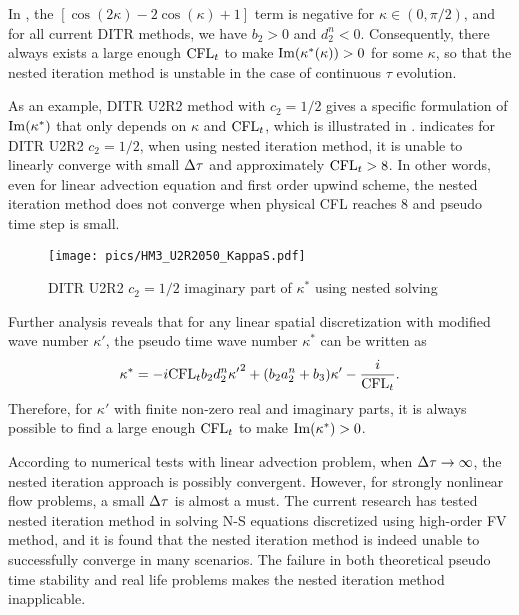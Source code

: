 In ,
the $\left[\cos(2\kappa) -2\cos(\kappa) + 1\right]$ term
is negative for $\kappa \in (0, \pi/2)$, and for
all current DITR methods, we have $b_2>0$ and $d_2^n < 0$.
Consequently, there always exists a large enough $\text{CFL}_t$
to make $\mathrm{Im}(\kappa^*(\kappa)) > 0$ for some $\kappa$,
so that the nested
iteration method is unstable in the case of continuous $\tau$
evolution.

As an example, DITR U2R2 method with $c_2=1/2$ gives
a specific formulation of $\mathrm{Im}(\kappa^*)$ that only depends on $\kappa$
and $\text{CFL}_t$, which is illustrated in .
 indicates for DITR U2R2 $c_2=1/2$,
when using nested iteration method, it is unable to linearly converge
with small ${\Delta} \tau$ and approximately $\text{CFL}_t > 8$.
In other words, even for linear advection equation and first order upwind
scheme,
the nested iteration method does not converge when physical CFL reaches 8
and pseudo time step is small.

\begin{figure}[htbp]
    \centering
    \texttt{[image: pics/HM3\_U2R2050\_KappaS.pdf]}
    \caption[]{DITR U2R2 $c_2=1/2$ imaginary part of $\kappa^*$ using
        nested solving}
    \label{fig:HM3_U2R2050_KappaS}
\end{figure}

Further analysis reveals that
for any linear spatial discretization with modified wave number $\kappa'$,
the pseudo time wave number $\kappa^*$ can be written as
\begin{equation}
    \begin{aligned}
        \kappa^* =
        -i\text{CFL}_t b_2 d_2^n {\kappa'}^2
        + (b_2a_2^n + b_3) \kappa' - \frac{i}{\text{CFL}_t}.
    \end{aligned}
    \label{eq:imagKsTauDITR_General}
\end{equation}
Therefore, for $\kappa'$ with finite non-zero real and imaginary parts,
it is always possible to find a large enough $\text{CFL}_t$ to make
$\mathrm{Im}(\kappa^*) > 0$.


According to numerical tests with linear advection problem,
when ${\Delta} \tau \rightarrow \infty$, the nested iteration
approach is possibly convergent. However, for strongly nonlinear
flow problems, a small ${\Delta} \tau$ is almost a must.
The current research has tested nested iteration method
in solving N-S equations discretized using high-order FV method,
and it is found that the nested iteration method is indeed unable to successfully
converge in many scenarios.
The failure in both theoretical pseudo time stability and
real life problems makes
the nested iteration method inapplicable.


